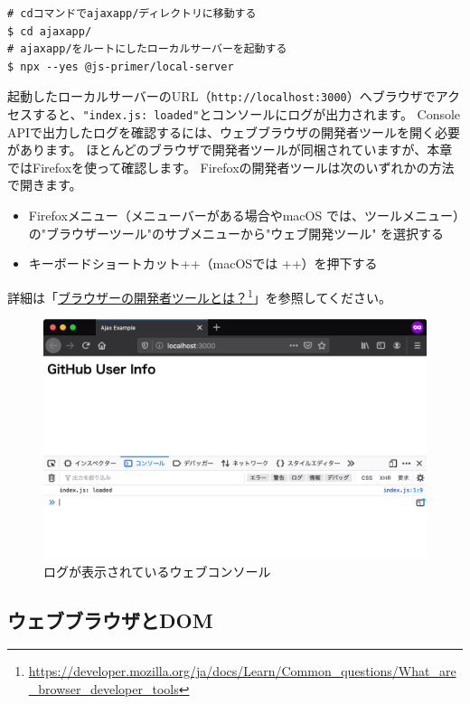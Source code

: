 \begin{lstlisting}
# cdコマンドでajaxapp/ディレクトリに移動する
$ cd ajaxapp/
# ajaxapp/をルートにしたローカルサーバーを起動する
$ npx --yes @js-primer/local-server
\end{lstlisting}

起動したローカルサーバーのURL（\texttt{http://localhost:3000}）へブラウザでアクセスすると、\texttt{"index.js: loaded"}とコンソールにログが出力されます。
Console
APIで出力したログを確認するには、ウェブブラウザの開発者ツールを開く必要があります。
ほとんどのブラウザで開発者ツールが同梱されていますが、本章ではFirefoxを使って確認します。
Firefoxの開発者ツールは次のいずれかの方法で開きます。

\begin{itemize}
\item
  Firefoxメニュー（メニューバーがある場合やmacOS
  では、ツールメニュー）の"ブラウザーツール"のサブメニューから"ウェブ開発ツール"
  を選択する
\item
  キーボードショートカット++（macOSでは
  ++）を押下する
\end{itemize}

詳細は「\href{https://developer.mozilla.org/ja/docs/Learn/Common_questions/What_are_browser_developer_tools}{ブラウザーの開発者ツールとは？}\footnote{\url{https://developer.mozilla.org/ja/docs/Learn/Common_questions/What_are_browser_developer_tools}}」を参照してください。

\begin{figure}[h]
\centering
\includegraphics[width=120mm]{fig/fig-1.pdf}
\caption{ログが表示されているウェブコンソール}
\end{figure}

\hypertarget{web-browsers-and-dom}{%
\subsection{ウェブブラウザとDOM}\label{web-browsers-and-dom}}

